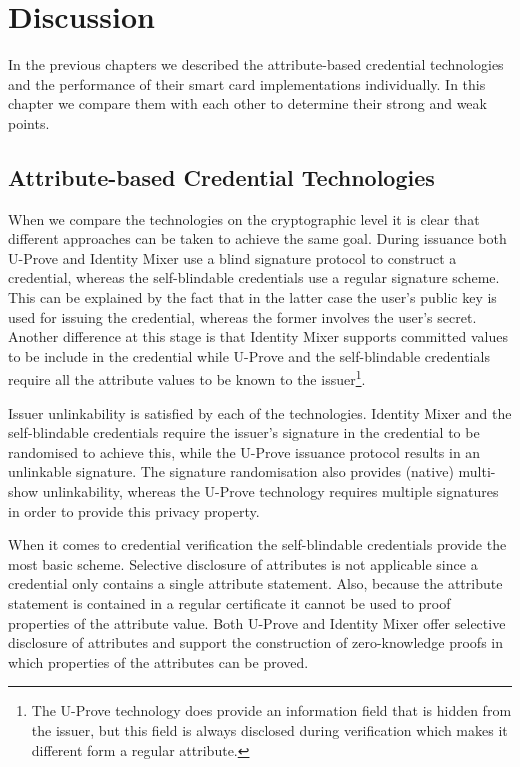 \chapter{Discussion\label{chp:discussion}}

In the previous chapters we described the attribute-based credential
technologies and the performance of their smart card implementations
individually. In this chapter we compare them with each other to determine their
strong and weak points.

\section{Attribute-based Credential Technologies}

When we compare the technologies on the cryptographic level it is clear that
different approaches can be taken to achieve the same goal. During issuance both
U-Prove and Identity Mixer use a blind signature protocol to construct a
credential, whereas the self-blindable credentials use a regular signature
scheme. This can be explained by the fact that in the latter case the user's
public key is used for issuing the credential, whereas the former involves the
user's secret. Another difference at this stage is that Identity Mixer supports
committed values to be include in the credential while U-Prove and the
self-blindable credentials require all the attribute values to be known to the
issuer\footnote{The U-Prove technology does provide an information field that
is hidden from the issuer, but this field is always disclosed during
verification which makes it different form a regular attribute.}.

Issuer unlinkability is satisfied by each of the technologies. Identity Mixer
and the self-blindable credentials require the issuer's signature in the
credential to be randomised to achieve this, while the U-Prove issuance protocol
results in an unlinkable signature. The signature randomisation also provides
(native) multi-show unlinkability, whereas the U-Prove technology requires
multiple signatures in order to provide this privacy property.

When it comes to credential verification the self-blindable credentials provide
the most basic scheme. Selective disclosure of attributes is not applicable
since a credential only contains a single attribute statement. Also, because the
attribute statement is contained in a regular certificate it cannot be used to
proof properties of the attribute value. Both U-Prove and Identity Mixer offer
selective disclosure of attributes and support the construction of
zero-knowledge proofs in which properties of the attributes can be proved.

